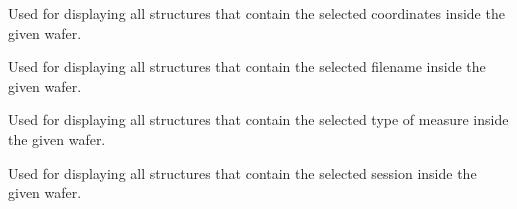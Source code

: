 \documentclass[letterpaper,10pt,english]{sphinxmanual}
\begin{document}

\begin{fulllineitems}
\label{\detokenize{app:app.filter_by_Coords}}
\pysigstartsignatures
{}
\pysigstopsignatures
\sphinxAtStartPar
Used for displaying all structures that contain the selected coordinates inside the given wafer.

\end{fulllineitems}


\begin{fulllineitems}
\label{\detokenize{app:app.filter_by_Filenames}}
\pysigstartsignatures
{}
\pysigstopsignatures
\sphinxAtStartPar
Used for displaying all structures that contain the selected filename inside the given wafer.

\end{fulllineitems}


\begin{fulllineitems}
\label{\detokenize{app:app.filter_by_Meas}}
\pysigstartsignatures
{}
\pysigstopsignatures
\sphinxAtStartPar
Used for displaying all structures that contain the selected type of measure inside the given wafer.

\end{fulllineitems}


\begin{fulllineitems}
\label{\detokenize{app:app.filter_by_Session}}
\pysigstartsignatures
{}
\pysigstopsignatures
\sphinxAtStartPar
Used for displaying all structures that contain the selected session inside the given wafer.

\end{fulllineitems}
\end{document}
